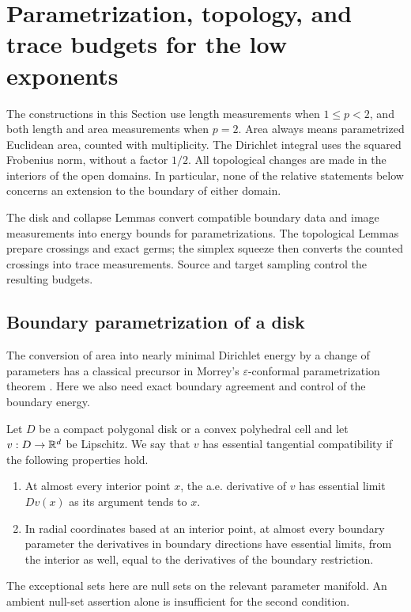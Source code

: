 \section{Parametrization, topology, and trace budgets for the low exponents}
\label{lt:section}\label{sec:low-tools}

The constructions in this Section use length measurements when
$1\leq p<2$, and both length and area measurements when $p=2$.
Area always means parametrized Euclidean area, counted with multiplicity.
The Dirichlet integral uses the squared Frobenius norm, without a factor
$1/2$.  All topological changes are made in the interiors of the open
domains.  In particular, none of the relative statements below concerns
an extension to the boundary of either domain.

The disk and collapse Lemmas convert compatible boundary data and image
measurements into energy bounds for parametrizations.  The topological
Lemmas prepare crossings and exact germs; the simplex squeeze then
converts the counted crossings into trace measurements.  Source and
target sampling control the resulting budgets.

\subsection{Boundary parametrization of a disk}

The conversion of area into nearly minimal Dirichlet energy by a
change of parameters has a classical precursor in Morrey's
$\varepsilon$-conformal parametrization theorem
\cite[Chapter~I, Section~9, Theorem~1.2]{Morrey1948}. Here we also
need exact boundary agreement and control of the boundary energy.

\begin{definition}
\label{lt:compatibility}
Let $D$ be a compact polygonal disk or a convex polyhedral cell and let
$v:D\to\mathbb R^d$ be Lipschitz.  We say that $v$ has essential tangential
compatibility if the following properties hold.
\begin{enumerate}
\item At almost every interior point $x$, the a.e. derivative of $v$ has
essential limit $Dv(x)$ as its argument tends to $x$.
\item In radial coordinates based at an interior point, at almost every
boundary parameter the derivatives in boundary directions have essential
limits, from the interior as well, equal to the derivatives of the
boundary restriction.
\end{enumerate}
The exceptional sets here are null sets on the relevant parameter
manifold.  An ambient null-set assertion alone is insufficient for the
second condition.
\end{definition}

